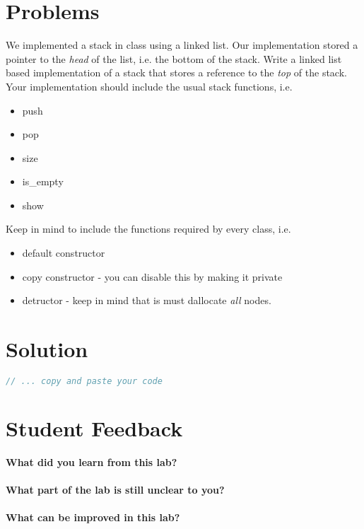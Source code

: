 \documentclass[11pt,fleqn]{book} %
\begin{document}
\section{Problems}
\begin{problem}
  We implemented a stack in class using a linked list. Our implementation stored a pointer to the {\it head} of the list, i.e. the bottom of the stack. Write a linked list based implementation of a stack that stores a reference to the {\it top} of the stack. Your implementation should include the usual stack functions, i.e.
  \begin{itemize}
  \item push
  \item pop
  \item size
  \item is\_empty
  \item show
  \end{itemize}
  Keep in mind to include the functions required by every class, i.e.
  \begin{itemize}
  \item default constructor
  \item copy constructor - you can disable this by making it private
  \item detructor - keep in mind that is must dallocate {\it all} nodes.
  \end{itemize}
\end{problem}

\newpage
\section{Solution}
\begin{lstlisting}[language=C++]
  // ... copy and paste your code
\end{lstlisting}

\newpage
\section{Student Feedback}
\textbf{What did you learn from this lab?}\\
\noindent\fbox{\parbox{\textwidth}{
  }
}\\
\textbf{What part of the lab is still unclear to you?}\\
\noindent\fbox{\parbox{\textwidth}{
  }
}\\
\textbf{What can be improved in this lab?}\\ 
\noindent\fbox{\parbox{\textwidth}{
  }
}\\
\end{document}
